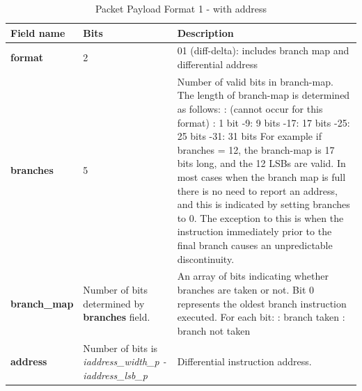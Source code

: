 \begin{table}[htp]
    \centering
    \caption{Packet Payload Format 1 - with address}
    \label{tab:te_inst0-1-addr}
    \begin{tabulary}{\textwidth}{|l|p{35mm}|p{80mm}|}
        \hline
        {\bf Field name} & {\bf Bits} & {\bf Description} \\
        \hline
        \textbf{format}	& 2	& 01 (diff-delta): includes branch map and differential address\\
        \hline
        \textbf{branches} & 5 & Number of valid bits in branch-map. The length of branch-map is determined as follows: :      (cannot occur for this format) : 	1 bit -9: 	9 bits -17: 	17 bits -25: 	25 bits -31: 	31 bits \newline
        For example if branches = 12, the branch-map is 17 bits long, and the 12 LSBs are valid. \newline
        In most cases when the branch map is full there is no need to report an address,
        and this is indicated by setting branches to 0.  The exception to this is when 
        the instruction immediately prior to the final branch causes an unpredictable discontinuity.\\
        \hline
        \textbf{branch\_map} & Number of bits \newline 
                     determined by \newline 
                     \textbf{branches} field. & 
                     An array of bits indicating whether branches are taken or not.\newline
        Bit 0 represents the oldest branch instruction executed.   For each bit: : branch taken : branch not taken \\
        \hline
        \textbf{address}	& Number of bits \newline 
                  is \textit {iaddress\_width\_p - iaddress\_lsb\_p} & 
                    Differential instruction address.\\
        \hline
    \end{tabulary}
\end{table}

